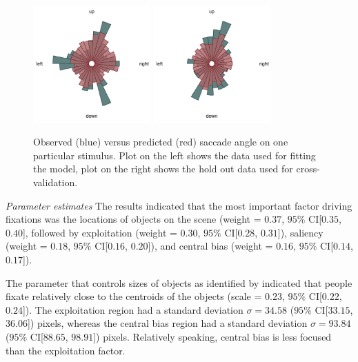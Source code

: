 \documentclass{article}
\begin{document}
\begin{figure}
    \centering
    \includegraphics[width=0.4\textwidth]{figures/fit_model/in_sample/angle/1251.jpg}
    \includegraphics[width=0.4\textwidth]{figures/fit_model/out_sample/angle/1251.jpg}
    \caption{Observed (blue) versus predicted (red) saccade angle on one particular stimulus. Plot on the left shows the data used for fitting the model, plot on the right shows the hold out data used for cross-validation.}
    \label{fig:predictives_in_sample_angle}
\end{figure}

\textit{Parameter estimates}
The results indicated that the most important factor driving fixations was the locations of objects on the scene (weight = $0.37$, $95\%$ CI[$0.35$, $0.40$], followed by exploitation (weight = $0.30$, $95\%$ CI[$0.28$, $0.31$]), saliency (weight = $0.18$, $95\%$ CI[$0.16$, $0.20$]), and central bias (weight = $0.16$, $95\%$ CI[$0.14$, $0.17$]).

The parameter that controls sizes of objects as identified by \citet{xu2014beyond} indicated that people fixate relatively close to the centroids of the objects (scale = $0.23$, $95\%$ CI[$0.22$, $0.24$]). The exploitation region had a standard deviation $\sigma = 34.58$ ($95\%$ CI[$33.15$, $36.06$]) pixels, whereas the central bias region had a standard deviation $\sigma = 93.84$ ($95\%$ CI[$88.65$, $98.91$]) pixels. Relatively speaking, central bias is less focused than the exploitation factor.
\end{document}
